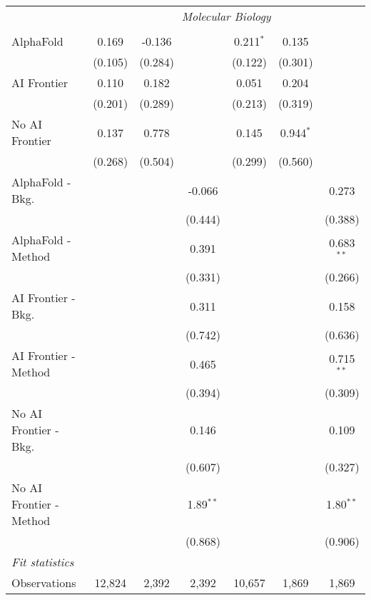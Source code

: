 \begin{tabular}{lcccccc}
 & \multicolumn{6}{c}{\textit{Molecular Biology}} \\ \\
   AlphaFold               & 0.169   & -0.136  &             & 0.211$^{*}$ & 0.135       &   \\   
                           & (0.105) & (0.284) &             & (0.122)     & (0.301)     &   \\   
   AI Frontier             & 0.110   & 0.182   &             & 0.051       & 0.204       &   \\   
                           & (0.201) & (0.289) &             & (0.213)     & (0.319)     &   \\   
   No AI Frontier          & 0.137   & 0.778   &             & 0.145       & 0.944$^{*}$ &   \\   
                           & (0.268) & (0.504) &             & (0.299)     & (0.560)     &   \\   
   AlphaFold - Bkg.        &         &         & -0.066      &             &             & 0.273\\   
                           &         &         & (0.444)     &             &             & (0.388)\\   
   AlphaFold - Method      &         &         & 0.391       &             &             & 0.683$^{**}$\\   
                           &         &         & (0.331)     &             &             & (0.266)\\   
   AI Frontier - Bkg.      &         &         & 0.311       &             &             & 0.158\\   
                           &         &         & (0.742)     &             &             & (0.636)\\   
   AI Frontier - Method    &         &         & 0.465       &             &             & 0.715$^{**}$\\   
                           &         &         & (0.394)     &             &             & (0.309)\\   
   No AI Frontier - Bkg.   &         &         & 0.146       &             &             & 0.109\\   
                           &         &         & (0.607)     &             &             & (0.327)\\   
   No AI Frontier - Method &         &         & 1.89$^{**}$ &             &             & 1.80$^{**}$\\   
                           &         &         & (0.868)     &             &             & (0.906)\\   
   \midrule
   \emph{Fit statistics}\\
   Observations            & 12,824  & 2,392   & 2,392       & 10,657      & 1,869       & 1,869\\  
   

\end{tabular}
